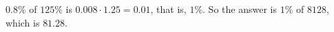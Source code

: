 $0.8\%$ of $125\%$ is $0.008\cdot1.25=0.01$, that is, $1\%$. So the answer is $1\%$ of $8128$, which is $\boxed{81.28}$.
